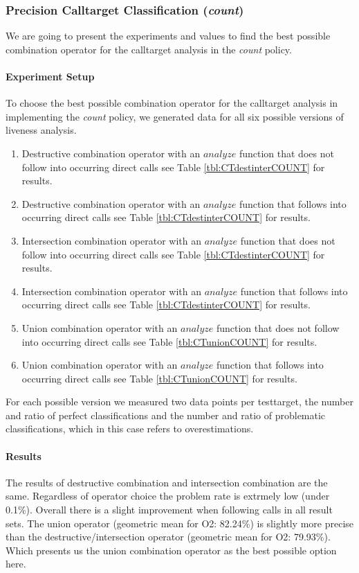 \subsubsection{Precision Calltarget Classification (\textit{count})}
\label{subsection:typeshieldprecision}
We are going to present the experiments and values to find the best possible combination operator for the calltarget analysis in the \textit{count} policy.

\paragraph{Experiment Setup}
To choose the best possible combination operator for the calltarget analysis in implementing the \textit{count} policy, we generated data for all six possible versions of liveness analysis.
\begin{enumerate}
\item Destructive combination operator with an $analyze$ function that does not follow into occurring direct calls see Table \ref{tbl:CTdestinterCOUNT} for results.
\item Destructive combination operator with an $analyze$ function that follows into occurring direct calls see Table \ref{tbl:CTdestinterCOUNT} for results.
\item Intersection combination operator with an $analyze$ function that does not follow into occurring direct calls see Table \ref{tbl:CTdestinterCOUNT} for results.
\item Intersection combination operator with an $analyze$ function that follows into occurring direct calls see Table \ref{tbl:CTdestinterCOUNT} for results.
\item Union combination operator with an $analyze$ function that does not follow into occurring direct calls see Table \ref{tbl:CTunionCOUNT} for results.
\item Union combination operator with an $analyze$ function that follows into occurring direct calls see Table \ref{tbl:CTunionCOUNT} for results.
\end{enumerate}
For each possible version we measured two data points per testtarget, the number and ratio of perfect classifications and the number and ratio of problematic classifications, which in this case refers to overestimations.
\paragraph{Results} The results of destructive combination and intersection combination are the same. Regardless of operator choice the problem rate is extrmely low (under 0.1\%). Overall there is a slight improvement when following calls in all result sets. The union operator (geometric mean for O2: 82.24\%) is slightly more precise than the destructive/intersection operator (geometric mean for O2: 79.93\%). Which presents us the union combination operator as the best possible option here.


